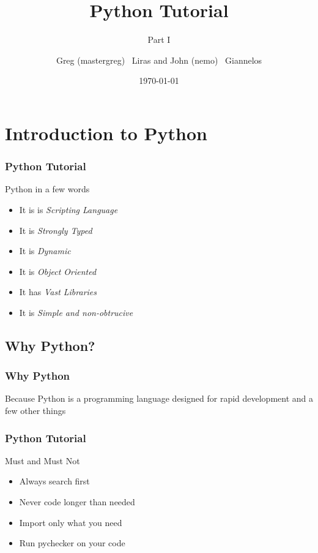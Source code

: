 \documentclass{beamer}
\author[nemo,mastergreg]{Greg (mastergreg) ~Liras and John (nemo)
~Giannelos}
\institute{foss.ntua}
\title{Python Tutorial}
\subtitle{Part I}
\date{\today}
\begin{document}
\frame{\titlepage}
\section[Outline]{}
\frame{\tableofcontents}

\section{Introduction to Python}
\begin{frame}
	\frametitle{Python Tutorial}

Python in a few words

\begin{itemize}
\item<1-> It is is \emph{Scripting Language}
\item<2-> It is \emph{Strongly Typed}
\item<3-> It is \emph{Dynamic}
\item<4-> It is \emph{Object Oriented}
\item<5-> It has \emph{Vast Libraries}
\item<6-> It is \emph{Simple and non-obtrucive}
\end{itemize}

\end{frame}

\subsection{Why Python?}
\begin{frame}
	\frametitle{Why Python}
	Because Python is a programming language 
	designed for rapid development
	and a few other things
\end{frame}
\begin{frame}
	\frametitle{Python Tutorial}

Must and Must Not

\begin{itemize}
\item<1-> Always search first
\item<2-> Never code longer than needed
\item<3-> Import only what you need
\item<4-> Run pychecker on your code
\end{itemize}

\end{frame}
\end{document}
